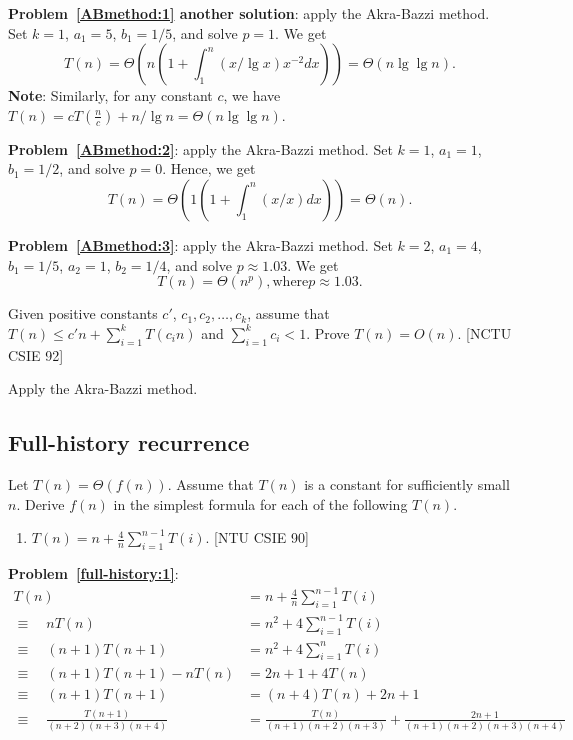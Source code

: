\begin{refsection}
\begin{Answer}
{\bf Problem~\ref{ABmethod:1} another solution}: apply the Akra\--Bazzi method. Set $k = 1$, $a_1 = 5$, $b_1 = 1/5$, and solve $p = 1$. We get
\[ T(n) = \Theta( n (1 + \int_{1}^n (x / \lg x) x^{-2} dx)) = \Theta(n \lg \lg n). \]
\textbf{Note}: Similarly, for any constant $c$, we have $T(n) = cT(\frac{n}{c}) + n/\lg n = \Theta(n \lg \lg n)$.

{\bf Problem~\ref{ABmethod:2}}: apply the Akra\--Bazzi method. Set $k = 1$, $a_1 = 1$, $b_1 = 1/2$, and solve $p = 0$. Hence, we get
\[ T(n) = \Theta( 1 (1 + \int_{1}^n (x / x) dx)) = \Theta(n). \]

{\bf Problem~\ref{ABmethod:3}}: apply the Akra\--Bazzi method. Set $k = 2$, $a_1 = 4$, $b_1 = 1/5$, $a_2 = 1$, $b_2 = 1/4$, and solve $p \approx 1.03$. We get
\[ T(n) = \Theta( n^{p}), \text{where} p \approx 1.03. \]

\end{Answer}

\begin{Exercise}
Given positive constants $c'$, $c_1, c_2, \dots, c_k$, assume that $T(n) \leq  c'n + \sum_{i=1}^k T(c_in)$ and $\sum_{i=1}^k c_i < 1$. Prove $T(n) = O(n)$. [NCTU CSIE 92] 
\end{Exercise}
\begin{Answer}
Apply the Akra\--Bazzi method.
\end{Answer}


\subsection{Full-history recurrence}
\begin{Exercise}
Let $T(n) = \Theta(f(n))$. Assume that $T(n)$ is a constant for sufficiently small $n$. Derive $f(n)$ in the simplest formula for each of the following $T(n)$.
\begin{enumerate}
\item $T(n) = n + \frac{4}{n} \sum_{i=1}^{n-1} T(i)$. \label{full-history:1} [NTU CSIE 90]
\end{enumerate}
\end{Exercise}
\begin{Answer}

{\bf Problem~\ref{full-history:1}}: 
\begin{align*}
T(n) & = n + \frac{4}{n} \sum_{i=1}^{n-1} T(i) \\
\equiv \quad nT(n) &= n^2 + 4\sum_{i=1}^{n-1} T(i) \\
\equiv \quad (n+1)T(n+1) &= n^2 + 4\sum_{i=1}^{n} T(i) \\
\equiv \quad (n+1)T(n+1) - nT(n) &= 2n + 1 + 4T(n) \\
\equiv \quad (n+1)T(n+1) &= (n+4)T(n) + 2n + 1 \\
\equiv \quad \frac{T(n+1)}{(n+2)(n+3)(n+4)} &= \frac{T(n)}{(n+1)(n+2)(n+3)} + \frac{2n+1}{(n+1)(n+2)(n+3)(n+4)} \\
\end{align*}


\end{Answer}
\end{refsection}
